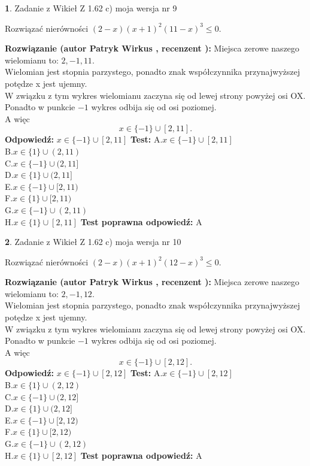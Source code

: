 \documentclass[12pt, a4paper]{article}
\theoremstyle{definition} %
\newtheorem{zad}{}
\newcommand{\zadStart}[1]{\begin{zad}#1\newline}
\newcommand{\zadStop}{\end{zad}}
\newcommand{\rozwStart}[2]{\noindent \textbf{Rozwiązanie (autor #1 , recenzent #2): }\newline}
\newcommand{\rozwStop}{\newline}
\newcommand{\odpStart}{\noindent \textbf{Odpowiedź:}\newline}
\newcommand{\odpStop}{\newline}
\newcommand{\testStart}{\noindent \textbf{Test:}\newline}
\newcommand{\testStop}{\newline}
\newcommand{\kluczStart}{\noindent \textbf{Test poprawna odpowiedź:}\newline}
\newcommand{\kluczStop}{\newline}
\begin{document}
\zadStart{Zadanie z Wikieł Z 1.62 c) moja wersja nr 9}

Rozwiązać nierówności $(2-x)(x+1)^{2}(11-x)^{3}\le0$.
\zadStop
\rozwStart{Patryk Wirkus}{}
Miejsca zerowe naszego wielomianu to: $2, -1, 11$.\\
Wielomian jest stopnia parzystego, ponadto znak współczynnika przy\linebreak najwyższej potędze x jest ujemny.\\ W związku z tym wykres wielomianu zaczyna się od lewej strony powyżej osi OX.\\
Ponadto w punkcie $-1$ wykres odbija się od osi poziomej.\\
A więc $$x \in \{-1\} \cup [2,11].$$
\rozwStop
\odpStart
$x \in \{-1\} \cup [2,11]$
\odpStop
\testStart
A.$x \in \{-1\} \cup [2,11]$\\
B.$x \in \{1\} \cup (2,11)$\\
C.$x \in \{-1\} \cup (2,11]$\\
D.$x \in \{1\} \cup (2,11]$\\
E.$x \in \{-1\} \cup [2,11)$\\
F.$x \in \{1\} \cup [2,11)$\\
G.$x \in \{-1\} \cup (2,11)$\\
H.$x \in \{1\} \cup [2,11]$
\testStop
\kluczStart
A
\kluczStop



\zadStart{Zadanie z Wikieł Z 1.62 c) moja wersja nr 10}

Rozwiązać nierówności $(2-x)(x+1)^{2}(12-x)^{3}\le0$.
\zadStop
\rozwStart{Patryk Wirkus}{}
Miejsca zerowe naszego wielomianu to: $2, -1, 12$.\\
Wielomian jest stopnia parzystego, ponadto znak współczynnika przy\linebreak najwyższej potędze x jest ujemny.\\ W związku z tym wykres wielomianu zaczyna się od lewej strony powyżej osi OX.\\
Ponadto w punkcie $-1$ wykres odbija się od osi poziomej.\\
A więc $$x \in \{-1\} \cup [2,12].$$
\rozwStop
\odpStart
$x \in \{-1\} \cup [2,12]$
\odpStop
\testStart
A.$x \in \{-1\} \cup [2,12]$\\
B.$x \in \{1\} \cup (2,12)$\\
C.$x \in \{-1\} \cup (2,12]$\\
D.$x \in \{1\} \cup (2,12]$\\
E.$x \in \{-1\} \cup [2,12)$\\
F.$x \in \{1\} \cup [2,12)$\\
G.$x \in \{-1\} \cup (2,12)$\\
H.$x \in \{1\} \cup [2,12]$
\testStop
\kluczStart
A
\kluczStop
\end{document}
